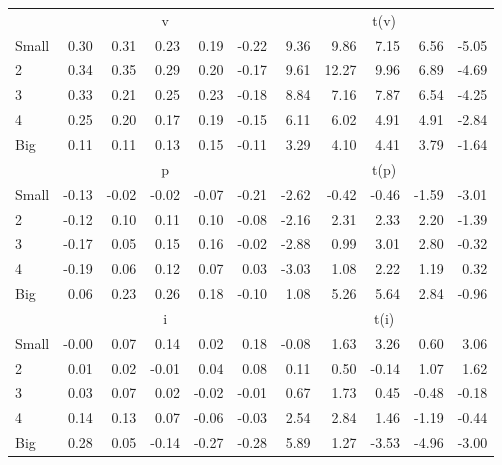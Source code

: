 \begin{table}[!ht]
\begin{tabular}{lrrrrrrrrrr}
  
     & \multicolumn{5}{c}{v} & \multicolumn{5}{c}{t(v)}   \\
     \cmidrule(r){2-6} \cmidrule(r){7-11} 
    Small  & 0.30  & 0.31  & 0.23  & 0.19  & -0.22  & 9.36  & 9.86  & 7.15  & 6.56  & -5.05   \\
    2  & 0.34  & 0.35  & 0.29  & 0.20  & -0.17  & 9.61  & 12.27  & 9.96  & 6.89  & -4.69   \\
    3  & 0.33  & 0.21  & 0.25  & 0.23  & -0.18  & 8.84  & 7.16  & 7.87  & 6.54  & -4.25   \\
    4  & 0.25  & 0.20  & 0.17  & 0.19  & -0.15  & 6.11  & 6.02  & 4.91  & 4.91  & -2.84   \\
    Big  & 0.11  & 0.11  & 0.13  & 0.15  & -0.11  & 3.29  & 4.10  & 4.41  & 3.79  & -1.64   \\
    
  
     & \multicolumn{5}{c}{p} & \multicolumn{5}{c}{t(p)}   \\
     \cmidrule(r){2-6} \cmidrule(r){7-11} 
    Small  & -0.13  & -0.02  & -0.02  & -0.07  & -0.21  & -2.62  & -0.42  & -0.46  & -1.59  & -3.01   \\
    2  & -0.12  & 0.10  & 0.11  & 0.10  & -0.08  & -2.16  & 2.31  & 2.33  & 2.20  & -1.39   \\
    3  & -0.17  & 0.05  & 0.15  & 0.16  & -0.02  & -2.88  & 0.99  & 3.01  & 2.80  & -0.32   \\
    4  & -0.19  & 0.06  & 0.12  & 0.07  & 0.03  & -3.03  & 1.08  & 2.22  & 1.19  & 0.32   \\
    Big  & 0.06  & 0.23  & 0.26  & 0.18  & -0.10  & 1.08  & 5.26  & 5.64  & 2.84  & -0.96   \\
    
  
     & \multicolumn{5}{c}{i} & \multicolumn{5}{c}{t(i)}   \\
     \cmidrule(r){2-6} \cmidrule(r){7-11} 
    Small  & -0.00  & 0.07  & 0.14  & 0.02  & 0.18  & -0.08  & 1.63  & 3.26  & 0.60  & 3.06   \\
    2  & 0.01  & 0.02  & -0.01  & 0.04  & 0.08  & 0.11  & 0.50  & -0.14  & 1.07  & 1.62   \\
    3  & 0.03  & 0.07  & 0.02  & -0.02  & -0.01  & 0.67  & 1.73  & 0.45  & -0.48  & -0.18   \\
    4  & 0.14  & 0.13  & 0.07  & -0.06  & -0.03  & 2.54  & 2.84  & 1.46  & -1.19  & -0.44   \\
    Big  & 0.28  & 0.05  & -0.14  & -0.27  & -0.28  & 5.89  & 1.27  & -3.53  & -4.96  & -3.00   \\
    

\end{tabular}
\end{table}
